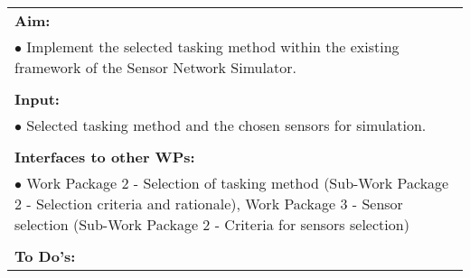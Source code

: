 \begin{table}[!h]
\begin{center}
\begin{tabular}{|p{35mm}||p{55mm}|p{50mm}||p{40mm}|}
      \hline\hline
      \multicolumn{4}{|p{150mm}|}{\textbf{Aim:}}                                                                                                                                                            \\
      \multicolumn{4}{|p{150mm}|}{$\bullet$ Implement the selected tasking method within the existing framework of the Sensor Network Simulator.}                                                   \\
      \multicolumn{4}{|p{150mm}|}{}                                                                                                                                                                           \\
      \multicolumn{4}{|p{150mm}|}{\textbf{Input:}}                                                                                                                                                            \\
      \multicolumn{4}{|p{150mm}|}{$\bullet$ Selected tasking method and the chosen sensors for simulation.}                                                                                                                                 \\
      \multicolumn{4}{|p{150mm}|}{}                                                                                                                                                                           \\
      \multicolumn{4}{|p{150mm}|}{\textbf{Interfaces to other WPs:}}                                                                                                                                    \\
      \multicolumn{4}{|p{150mm}|}{$\bullet$ Work Package 2 - Selection of tasking method (Sub-Work Package 2 - Selection criteria and rationale), Work Package 3 - Sensor selection (Sub-Work Package 2 - Criteria for sensors selection)}                                                                                              \\
      \multicolumn{4}{|p{150mm}|}{}                                                                                                                                                                           \\
      \multicolumn{4}{|p{150mm}|}{\textbf{To Do's:}}                                                                                                                                                         \\

\end{tabular}
\end{center}
\end{table}
